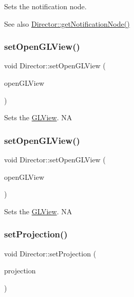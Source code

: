 Sets the notification node. \begin{DoxySeeAlso}{See also}
\hyperlink{classDirector_a33fe947ebf154c242198d3ad0d95cba4}{Director\+::get\+Notification\+Node()} 
\end{DoxySeeAlso}
\mbox{\label{classDirector_a6c9edb0fdb7c3c7142e90a16b80b0949}} 
\subsubsection{\texorpdfstring{set\+Open\+G\+L\+View()}{setOpenGLView()}\hspace{0.1cm}{\footnotesize\ttfamily [1/2]}}
{\footnotesize\ttfamily void Director\+::set\+Open\+G\+L\+View (\begin{DoxyParamCaption}\item[{\hyperlink{classGLView}{G\+L\+View} $\ast$}]{open\+G\+L\+View }\end{DoxyParamCaption})}

Sets the \hyperlink{classGLView}{G\+L\+View}.  NA \mbox{\label{classDirector_a6c9edb0fdb7c3c7142e90a16b80b0949}} 
\subsubsection{\texorpdfstring{set\+Open\+G\+L\+View()}{setOpenGLView()}\hspace{0.1cm}{\footnotesize\ttfamily [2/2]}}
{\footnotesize\ttfamily void Director\+::set\+Open\+G\+L\+View (\begin{DoxyParamCaption}\item[{\hyperlink{classGLView}{G\+L\+View} $\ast$}]{open\+G\+L\+View }\end{DoxyParamCaption})}

Sets the \hyperlink{classGLView}{G\+L\+View}.  NA \mbox{\label{classDirector_a4cffcad9b7c5cbb16e5e0780ab5401b9}} 
\subsubsection{\texorpdfstring{set\+Projection()}{setProjection()}\hspace{0.1cm}{\footnotesize\ttfamily [1/2]}}
{\footnotesize\ttfamily void Director\+::set\+Projection (\begin{DoxyParamCaption}\item[{\hyperlink{classDirector_aaa3d9a0eac7c805d87ecba67c974fcf2}{Projection}}]{projection }\end{DoxyParamCaption})}

